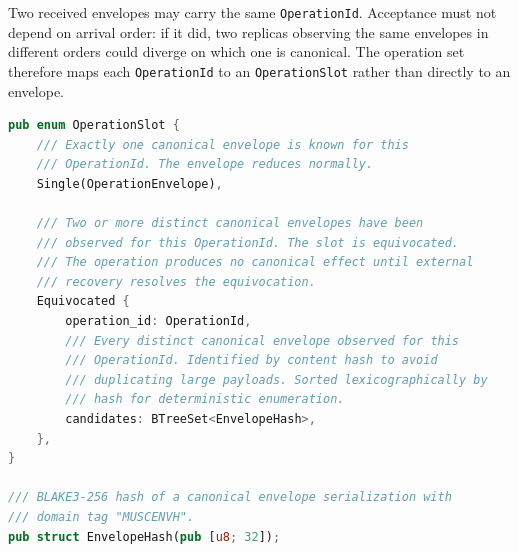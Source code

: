 \documentclass[11pt,letterpaper]{report}
\begin{document}
Two received envelopes may carry the same \texttt{OperationId}.
Acceptance must not depend on arrival order: if it did, two
replicas observing the same envelopes in different orders could
diverge on which one is canonical. The operation set therefore
maps each \texttt{OperationId} to an \texttt{OperationSlot}
rather than directly to an envelope.

\begin{lstlisting}[language=Rust]
pub enum OperationSlot {
    /// Exactly one canonical envelope is known for this
    /// OperationId. The envelope reduces normally.
    Single(OperationEnvelope),

    /// Two or more distinct canonical envelopes have been
    /// observed for this OperationId. The slot is equivocated.
    /// The operation produces no canonical effect until external
    /// recovery resolves the equivocation.
    Equivocated {
        operation_id: OperationId,
        /// Every distinct canonical envelope observed for this
        /// OperationId. Identified by content hash to avoid
        /// duplicating large payloads. Sorted lexicographically by
        /// hash for deterministic enumeration.
        candidates: BTreeSet<EnvelopeHash>,
    },
}

/// BLAKE3-256 hash of a canonical envelope serialization with
/// domain tag "MUSCENVH".
pub struct EnvelopeHash(pub [u8; 32]);
\end{lstlisting}
\end{document}
